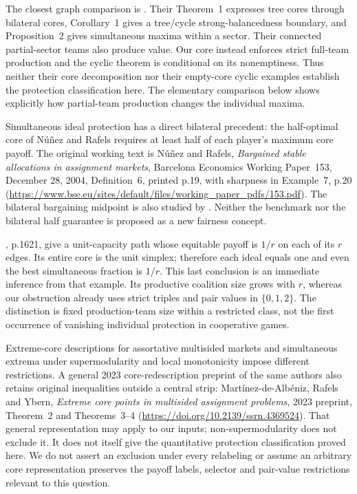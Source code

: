 \documentclass[11pt]{article}
\theoremstyle{remark}\newtheorem{remark}[theorem]{Remark}
\begin{document}
The closest graph comparison is \citet{AtayNunez2019}. Their Theorem~1
expresses tree cores through bilateral cores, Corollary~1 gives a tree/cycle
strong-balancedness boundary, and Proposition~2 gives simultaneous maxima
within a sector. Their connected partial-sector teams also produce value.
Our core instead enforces strict full-team production and the cyclic theorem
is conditional on its nonemptiness. Thus neither their core decomposition
nor their empty-core cyclic examples establish the protection classification
here. The elementary comparison below shows explicitly how partial-team
production changes the individual maxima.

Simultaneous ideal protection has a direct bilateral precedent: the
half-optimal core of N\'u\~nez and Rafels requires at least half of each
player's maximum core payoff. The original working text is N\'u\~nez and
Rafels, \emph{Bargained stable allocations in assignment markets}, Barcelona
Economics Working Paper~153, December 28, 2004, Definition~6, printed p.19,
with sharpness in Example~7, p.20
(\url{https://www.bse.eu/sites/default/files/working_paper_pdfs/153.pdf}).
The bilateral bargaining midpoint is also studied by
\citet{NunezRafels2008}. Neither the benchmark nor the bilateral half guarantee
is proposed as a new fairness concept.

\citet{Gangam2026}, p.1621, give a unit-capacity path whose equitable payoff
is $1/r$ on each of its $r$ edges. Its entire core is the unit simplex;
therefore each ideal equals one and even the best simultaneous fraction is
$1/r$. This last conclusion is an immediate inference from that example.
Its productive coalition size grows with $r$, whereas our obstruction already
uses strict triples and pair values in $\{0,1,2\}$. The distinction is fixed
production-team size within a restricted class, not the first occurrence of
vanishing individual protection in cooperative games.

Extreme-core descriptions for assortative multisided markets
\citep{Martinez2020} and simultaneous extrema under supermodularity and local
monotonicity \citep{Martinez2026} impose different restrictions. A general
2023 core-redescription preprint of the same authors also retains original
inequalities outside a central strip: Mart\'inez-de-Alb\'eniz, Rafels and
Ybern, \emph{Extreme core points in multisided assignment problems}, 2023
preprint, Theorem~2 and Theorems~3--4
(\url{https://doi.org/10.2139/ssrn.4369524}).
That general representation may apply to our inputs; non-supermodularity
does not exclude it. It does not itself give the quantitative protection
classification proved here. We do not assert an exclusion under every
relabeling or assume an arbitrary core representation preserves the payoff
labels, selector and pair-value restrictions relevant to this question.
\end{document}
